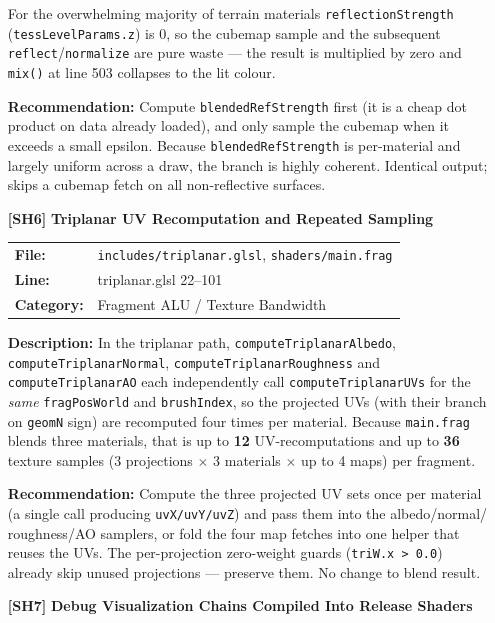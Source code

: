 \documentclass[a4paper,12pt]{article}
\newcommand{\severitybox}[2]{%
  \colorbox{#1}{\makebox[2.5cm][c]{\textcolor{white}{\textbf{#2}}}}%
}
\begin{document}
\begin{enumerate}[leftmargin=*]
  For the overwhelming majority of terrain materials \texttt{reflectionStrength}
  (\texttt{tessLevelParams.z}) is 0, so the cubemap sample and the subsequent
  \texttt{reflect}/\texttt{normalize} are pure waste — the result is multiplied
  by zero and \texttt{mix()} at line 503 collapses to the lit colour.

  \textbf{Recommendation:}
  Compute \texttt{blendedRefStrength} first (it is a cheap dot product on data
  already loaded), and only sample the cubemap when it exceeds a small epsilon.
  Because \texttt{blendedRefStrength} is per-material and largely uniform across
  a draw, the branch is highly coherent. Identical output; skips a cubemap fetch
  on all non-reflective surfaces.

\item[\textbf{[SH6]}] \textbf{Triplanar UV Recomputation and Repeated Sampling}
  \hfill \severitybox{mediumcolor}{MEDIUM}

  \begin{tabular}{ll}
    \textbf{File:} & \texttt{includes/triplanar.glsl}, \texttt{shaders/main.frag} \\
    \textbf{Line:} & triplanar.glsl 22--101 \\
    \textbf{Category:} & Fragment ALU / Texture Bandwidth \\
  \end{tabular}

  \textbf{Description:}
  In the triplanar path, \texttt{computeTriplanarAlbedo},
  \texttt{computeTriplanarNormal}, \texttt{computeTriplanarRoughness} and
  \texttt{computeTriplanarAO} each independently call
  \texttt{computeTriplanarUVs} for the \emph{same} \texttt{fragPosWorld} and
  \texttt{brushIndex}, so the projected UVs (with their branch on
  \texttt{geomN} sign) are recomputed four times per material. Because
  \texttt{main.frag} blends three materials, that is up to \textbf{12}
  UV-recomputations and up to \textbf{36} texture samples (3 projections
  $\times$ 3 materials $\times$ up to 4 maps) per fragment.

  \textbf{Recommendation:}
  Compute the three projected UV sets once per material (a single call
  producing \texttt{uvX/uvY/uvZ}) and pass them into the albedo/normal/
  roughness/AO samplers, or fold the four map fetches into one helper that
  reuses the UVs. The per-projection zero-weight guards (\texttt{triW.x > 0.0})
  already skip unused projections — preserve them. No change to blend result.

\item[\textbf{[SH7]}] \textbf{Debug Visualization Chains Compiled Into Release Shaders}
  \hfill \severitybox{mediumcolor}{MEDIUM}


\end{enumerate}
\end{document}
